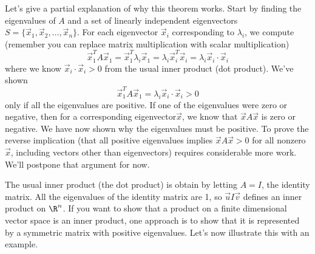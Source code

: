 Let's give a partial explanation of why this theorem works. 
Start by finding the eigenvalues of $A$ and a set of linearly independent eigenvectors $S = \{\vec x_1,\vec x_2,\ldots,\vec x_n\}$. For each eigenvector $\vec x_i$ corresponding to $\lambda_i$, we compute (remember you can replace matrix multiplication with scalar multiplication)
$$\vec x_1^T A \vec x_1 = \vec x_1^T \lambda_i \vec x_1  = \lambda_i \vec x_i^T\vec x_i = \lambda_i \vec x_i\cdot \vec x_i$$
where we know $\vec x_i\cdot \vec x_i>0$ from the usual inner product (dot product). 
We've shown  $$\vec x_1^T A \vec x_1=\lambda_i\vec x_i\cdot \vec x_i>0$$ only if all the eigenvalues are positive.  
If one of the eigenvalues were zero or negative, then for a corresponding eigenvector$\vec x$, we know that $\vec x A\vec x$ is zero or negative.  We have now shown why the eigenvalues must be positive.  To prove the reverse implication (that all positive eigenvalues implies $\vec x A\vec x>0$ for all nonzero $\vec x$, including vectors other than eigenvectors)  requires considerable more work. We'll postpone that argument for now.

The usual inner product (the dot product) is obtain by letting $A=I$, the identity matrix. 
All the eigenvalues of the identity matrix are 1, so $\vec u I \vec v$ defines an inner product on $\R^n$. 
If you want to show that a product on a finite dimensional vector space is an inner product, 
one approach is to show that it is represented by a symmetric matrix with positive eigenvalues. 
Let's now illustrate this with an example.

